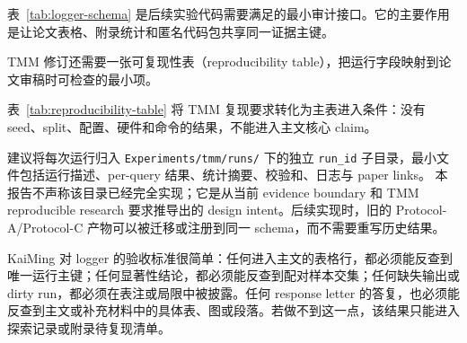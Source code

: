 表~\ref{tab:logger-schema} 是后续实验代码需要满足的最小审计接口。它的主要作用是让论文表格、附录统计和匿名代码包共享同一证据主键。

TMM 修订还需要一张可复现性表（reproducibility table），把运行字段映射到论文审稿时可检查的最小项。

\begin{table}[H]
	\centering
	\caption{可复现性表：random seed、数据划分、配置、硬件与运行命令。}
	\label{tab:reproducibility-table}
	\scriptsize
\end{table}

表~\ref{tab:reproducibility-table} 将 TMM 复现要求转化为主表进入条件：没有 seed、split、配置、硬件和命令的结果，不能进入主文核心 claim。



建议将每次运行归入 \texttt{Experiments/tmm/runs/} 下的独立 \texttt{run\_id} 子目录，最小文件包括运行描述、per-query 结果、统计摘要、校验和、日志与 paper links。 本报告不声称该目录已经完全实现；它是从当前 evidence boundary 和 TMM reproducible research 要求推导出的 design intent。后续实现时，旧的 Protocol-A/Protocol-C 产物可以被迁移或注册到同一 schema，而不需要重写历史结果。

KaiMing 对 logger 的验收标准很简单：任何进入主文的表格行，都必须能反查到唯一运行主键；任何显著性结论，都必须能反查到配对样本交集；任何缺失输出或 dirty run，都必须在表注或局限中被披露。任何 response letter 的答复，也必须能反查到主文或补充材料中的具体表、图或段落。若做不到这一点，该结果只能进入探索记录或附录待复现清单。

